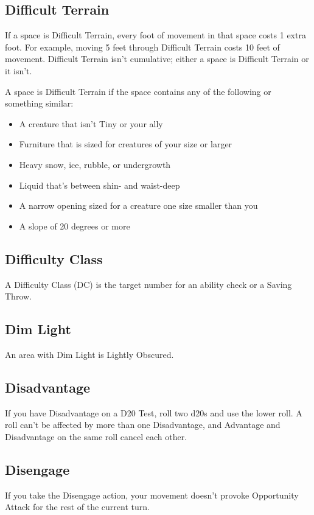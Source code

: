 \documentclass[10pt,a4paper,twoside,bg=print,twocolumn,openany,nodeprecatedcode]{dndarticle}
\begin{document}
\subsection{Difficult Terrain}
If a space is Difficult Terrain, every foot of movement in that space costs 1 extra foot. For example, moving 5 feet through Difficult Terrain costs 10 feet of movement. Difficult Terrain isn't cumulative; either a space is Difficult Terrain or it isn't.

A space is Difficult Terrain if the space contains any of the following or something similar:


\begin{itemize}
\item A creature that isn't Tiny or your ally
\item Furniture that is sized for creatures of your size or larger
\item Heavy snow, ice, rubble, or undergrowth
\item Liquid that's between shin- and waist-deep
\item A narrow opening sized for a creature one size smaller than you
\item A slope of 20 degrees or more
\end{itemize}

\subsection{Difficulty Class}
A Difficulty Class (DC) is the target number for an ability check or a Saving Throw.

\subsection{Dim Light}
An area with Dim Light is Lightly Obscured.

\subsection{Disadvantage}
If you have Disadvantage on a D20 Test, roll two d20s and use the lower roll. A roll can't be affected by more than one Disadvantage, and Advantage and Disadvantage on the same roll cancel each other.

\subsection{Disengage}
If you take the Disengage action, your movement doesn't provoke Opportunity Attack for the rest of the current turn.
\end{document}
